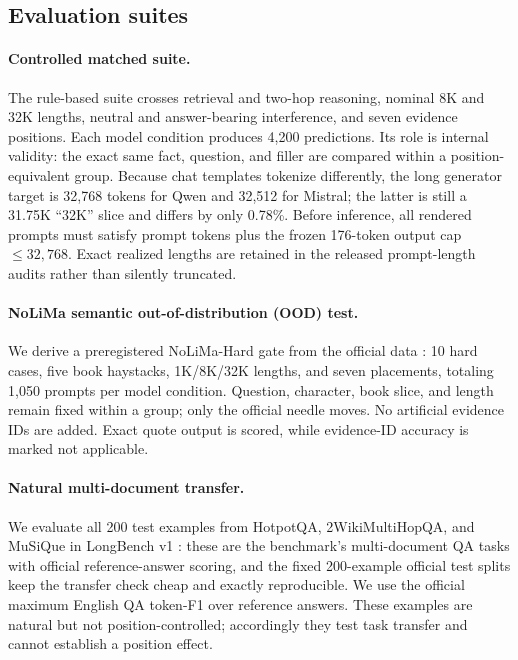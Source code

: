 \documentclass[11pt]{article}
\begin{document}
\subsection{Evaluation suites}

\paragraph{Controlled matched suite.}
The rule-based suite crosses retrieval and two-hop reasoning, nominal 8K and 32K lengths, neutral and answer-bearing interference, and seven evidence positions. Each model condition produces 4,200 predictions. Its role is internal validity: the exact same fact, question, and filler are compared within a position-equivalent group. Because chat templates tokenize differently, the long generator target is 32,768 tokens for Qwen and 32,512 for Mistral; the latter is still a 31.75K ``32K'' slice and differs by only 0.78\%. Before inference, all rendered prompts must satisfy prompt tokens plus the frozen 176-token output cap $\leq 32{,}768$. Exact realized lengths are retained in the released prompt-length audits rather than silently truncated.

\paragraph{NoLiMa semantic out-of-distribution (OOD) test.}
We derive a preregistered NoLiMa-Hard gate from the official data \citep{modarressi2025nolima}: 10 hard cases, five book haystacks, 1K/8K/32K lengths, and seven placements, totaling 1,050 prompts per model condition. Question, character, book slice, and length remain fixed within a group; only the official needle moves. No artificial evidence IDs are added. Exact quote output is scored, while evidence-ID accuracy is marked not applicable.

\paragraph{Natural multi-document transfer.}
We evaluate all 200 test examples from HotpotQA, 2WikiMultiHopQA, and MuSiQue in LongBench v1 \citep{bai2024longbench}: these are the benchmark's multi-document QA tasks with official reference-answer scoring, and the fixed 200-example official test splits keep the transfer check cheap and exactly reproducible. We use the official maximum English QA token-F1 over reference answers. These examples are natural but not position-controlled; accordingly they test task transfer and cannot establish a position effect.
\end{document}
